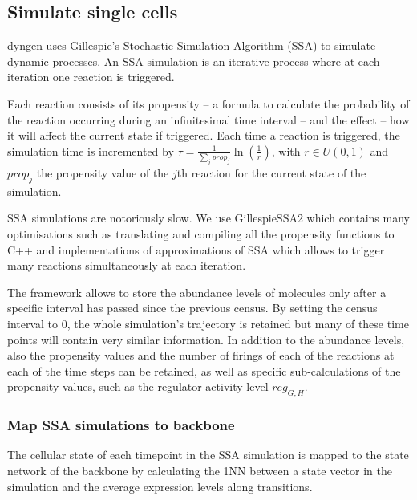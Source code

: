\subsection{Simulate single cells} \label{sec:dyngen_ssa}



dyngen uses Gillespie's Stochastic Simulation Algorithm (SSA) to simulate dynamic processes. An SSA simulation is an iterative process where at each iteration one reaction is triggered. 

Each reaction consists of its propensity -- a formula to calculate the probability of the reaction occurring during an infinitesimal time interval -- and the effect -- how it will affect the current state if triggered. Each time a reaction is triggered, the simulation time is incremented by $\tau = \frac{1}{\sum_j prop_j} \ln\left(\frac{1}{r}\right)$, with $r \in U(0, 1)$ and $prop_j$ the propensity value of the $j$th reaction for the current state of the simulation.

SSA simulations are notoriously slow. We use GillespieSSA2 which contains many optimisations such as translating and compiling all the propensity functions to C++ and implementations of approximations of SSA which allows to trigger many reactions simultaneously at each iteration.

The framework allows to store the abundance levels of molecules only after a specific interval has passed since the previous census. By setting the census interval to 0, the whole simulation's trajectory is retained but many of these time points will contain very similar information. In addition to the abundance levels, also the propensity values and the number of firings of each of the reactions at each of the time steps can be retained, as well as specific sub-calculations of the propensity values, such as the regulator activity level $reg_{G,H}$. 

\subsubsection{Map SSA simulations to backbone}
The cellular state of each timepoint in the SSA simulation is mapped to the state network of the backbone by calculating the 1NN between a state vector in the simulation and the average expression levels along transitions.

